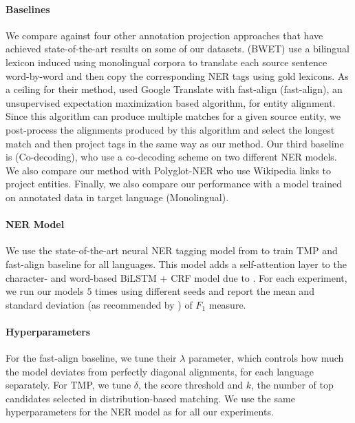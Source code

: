 \documentclass[11pt,a4paper]{article}
\begin{document}
\paragraph{Baselines}
We compare against
four other annotation projection approaches 
that have achieved state-of-the-art results on some of our datasets. 
\citet{xie2018neural} (BWET) use a bilingual lexicon 
induced using monolingual corpora \cite{conneau2017word} 
to translate each source sentence word-by-word 
and then copy the corresponding NER tags using gold lexicons.
As a ceiling for their method, \citet{mayhew2017cheap} used Google Translate 
with fast-align \cite{dyer2013fastalign} (fast-align), 
an unsupervised expectation maximization based algorithm, for entity alignment. 
Since this algorithm can produce multiple matches for a given source entity, 
we post-process the alignments produced by this algorithm 
and select the longest match and then project tags 
in the same way as our method.
Our third baseline is \citet{ni2017weakly} (Co-decoding), 
who use a co-decoding scheme on two different NER models.
We also compare our method with Polyglot-NER \cite{al2015polyglot} 
who use Wikipedia links to project entities. 
Finally, we also compare our performance with a model trained on annotated data in target language (Monolingual).






\paragraph{NER Model}
We use the state-of-the-art neural NER tagging model from \cite{xie2018neural} 
to train TMP and fast-align baseline for all languages. 
This model adds a self-attention layer to the 
character- and word-based BiLSTM + CRF model due to \citet{lample2016neural}. 
For each experiment, we run our models $5$ times using different seeds 
and report the mean and standard deviation 
(as recommended by \citet{reimers2017reporting}) of $F_1$ measure.






\paragraph{Hyperparameters}
For the fast-align baseline, we tune their $\lambda$ parameter,
which controls how much the model deviates 
from perfectly diagonal alignments, for each language separately. 
For TMP, we tune $\delta$, the score threshold and $k$, the number of top candidates selected in distribution-based matching.  
We use the same hyperparameters for the NER model as \citet{xie2018neural} 
for all our experiments.
\end{document}

